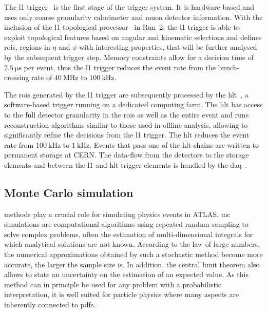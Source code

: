 The \gls{l1} trigger~\cite{CERN-LHCC-98-014} is the first stage of the trigger system. It is hardware-based and uses only coarse granularity calorimeter and muon detector information. With the inclusion of the \gls{l1} topological processor~\cite{Aad:2020wji} in Run~2, the \gls{l1} trigger is able to exploit topological features based on angular and kinematic selections and defines \glspl{roi}, \ie regions in $\eta$ and $\phi$ with interesting properties, that will be further analysed by the subsequent trigger step. Memory constraints allow for a decision time of $\SI{2.5}{\micro\second}$ per event, thus the \gls{l1} trigger reduces the event rate from the bunch-crossing rate of $\SI{40}{\MHz}$ to $\SI{100}{\kHz}$. 

The \glspl{roi} generated by the \gls{l1} trigger are subsequently processed by the \gls{hlt}~\cite{Jenni:616089}, a software-based trigger running on a dedicated computing farm. The \gls{hlt} has access to the full detector granularity in the \glspl{roi} as well as the entire event and runs reconstruction algorithms similar to those used in offline analysis, allowing to significantly refine the decisions from the \gls{l1} trigger. The \gls{hlt} reduces the event rate from $\SI{100}{\kHz}$ to $\SI{1}{\kHz}$. Events that pass one of the \gls{hlt} chains are written to permanent storage at CERN. The data-flow from the detectors to the storage elements and between the \gls{l1} and \gls{hlt} trigger elements is handled by the \gls{daq}~\cite{Jenni:616089}.


\subsection{Monte Carlo simulation}\label{sec:mc_simulation}

 methods play a crucial role for simulating physics events in ATLAS. \gls{mc} simulations are computational algorithms using repeated random sampling to solve complex problems, often the estimation of multi-dimensional integrals for which analytical solutions are not known. According to the law of large numbers, the numerical approximations obtained by such a stochastic method become more accurate, the larger the sample size is. In addition, the central limit theorem also allows to state an uncertainty on the estimation of an expected value.  As this method can in principle be used for any problem with a probabilistic interpretation, it is well suited for particle physics where many aspects are inherently connected to \glspl{pdf}. 

